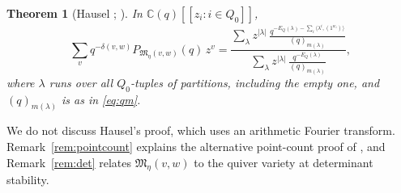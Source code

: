 \documentclass[11pt]{amsart}
\newtheorem{theorem}{Theorem}[section]
\theoremstyle{definition}
\theoremstyle{remark}
\numberwithin{equation}{section}
\newcommand{\C}{\mathbb{C}}
\begin{document}
\begin{theorem}[Hausel \cite{Hau}; {\cite[(6.9)]{Hik}}]\label{thm:hausel}
In $\C(q)[[z_i:i\in Q_0]]$,
\begin{equation}\label{eq:hausel}
  \sum_{v}q^{-\delta(v,w)}P_{\mathfrak M_\eta(v,w)}(q)\,z^v
  =\frac{\displaystyle\sum_{\lambda}z^{|\lambda|}\,
      \frac{q^{-E_Q(\lambda)-\sum_i\langle\lambda^i,(1^{w_i})\rangle}}{(q)_{m(\lambda)}}}
     {\displaystyle\sum_{\lambda}z^{|\lambda|}\,\frac{q^{-E_Q(\lambda)}}{(q)_{m(\lambda)}}},
\end{equation}
where $\lambda$ runs over all $Q_0$-tuples of partitions, including the empty one, and $(q)_{m(\lambda)}$ is
as in \eqref{eq:qm}.
\end{theorem}

We do not discuss Hausel's proof, which uses an arithmetic Fourier transform. Remark~\ref{rem:pointcount}
explains the alternative point-count proof of \cite{Nak04}, and Remark~\ref{rem:det} relates
$\mathfrak M_\eta(v,w)$ to the quiver variety at determinant stability.
\end{document}
